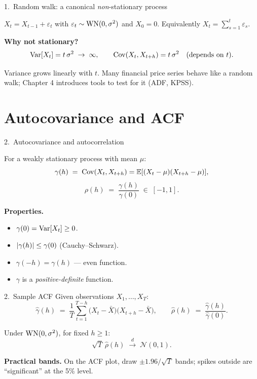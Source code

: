 \documentclass[aspectratio=169]{beamer}
\begin{document}
\begin{frame}{1.~Random walk: a canonical \emph{non}-stationary process}
  \begin{defbox}
    $X_t = X_{t-1} + \varepsilon_t$ with $\varepsilon_t \sim \mathrm{WN}(0, \sigma^2)$
    and $X_0 = 0$. Equivalently $X_t = \sum_{s=1}^{t}\varepsilon_s$.
  \end{defbox}
  \medskip
  \textbf{Why not stationary?}
  \[
    \mathrm{Var}[X_t] = t\, \sigma^2 \;\to\; \infty,
    \qquad
    \mathrm{Cov}(X_t, X_{t+h}) = t\, \sigma^2 \quad (\text{depends on } t).
  \]
  \medskip
  \begin{warnbox}
    Variance grows linearly with $t$. Many financial price series
    behave like a random walk; Chapter 4 introduces tools to test
    for it (ADF, KPSS).
  \end{warnbox}
\end{frame}

\section{Autocovariance and ACF}

\begin{frame}{2.~Autocovariance and autocorrelation}
  \begin{defbox}
    For a weakly stationary process with mean $\mu$:
    \[
      \gamma(h) \;=\; \mathrm{Cov}(X_t, X_{t+h}) = \mathbb{E}[(X_t - \mu)(X_{t+h} - \mu)],
    \]
    \[
      \rho(h) \;=\; \frac{\gamma(h)}{\gamma(0)} \;\in\; [-1, 1].
    \]
  \end{defbox}
  \medskip
  \textbf{Properties.}
  \begin{itemize}
    \item $\gamma(0) = \mathrm{Var}[X_t] \geq 0$.
    \item $\left\lvert \gamma(h) \right\rvert \leq \gamma(0)$ (Cauchy--Schwarz).
    \item $\gamma(-h) = \gamma(h)$ — even function.
    \item $\gamma$ is a \emph{positive-definite} function.
  \end{itemize}
\end{frame}

\begin{frame}{2.~Sample ACF}
  Given observations $X_1, \dots, X_T$:
  \[
    \widehat{\gamma}(h) \;=\; \frac{1}{T}\sum_{t = 1}^{T - h}
      \bigl(X_t - \bar{X}\bigr)\bigl(X_{t+h} - \bar{X}\bigr),
    \qquad
    \widehat{\rho}(h) \;=\; \frac{\widehat{\gamma}(h)}{\widehat{\gamma}(0)}.
  \]
  \medskip
  \begin{thbox}
    Under $\mathrm{WN}(0, \sigma^2)$, for fixed $h \geq 1$:
    \[
      \sqrt{T}\,\widehat{\rho}(h) \;\xrightarrow{d}\; \mathcal{N}(0, 1).
    \]
  \end{thbox}
  \medskip
  \textbf{Practical bands.} On the ACF plot, draw $\pm 1.96/\sqrt{T}$
  bands; spikes outside are ``significant'' at the 5\% level.
\end{frame}
\end{document}
